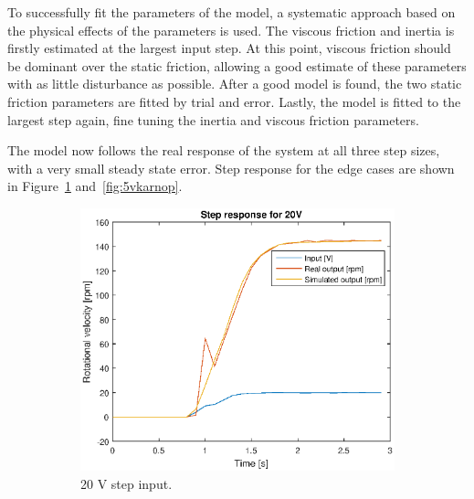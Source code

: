 To successfully fit the parameters of the model, a systematic approach based on
the physical effects of the parameters is used. The viscous friction and inertia 
is firstly estimated at the largest input step. At this point, viscous friction
should be dominant over the static friction, allowing a good estimate of these
parameters with as little disturbance as possible. After a good model is found,
the two static friction parameters are fitted by trial and error. Lastly, the
model is fitted to the largest step again, fine tuning the inertia and viscous
friction parameters.

The model now follows the real response of the system at all three step sizes,
with a very small steady state error. Step response for the edge cases are shown
in Figure~\ref{fig:20vkarnop} and~\ref{fig:5vkarnop}.
\begin{figure}[H]
    \centering
    \begin{subfigure}[H]{0.48\textwidth}
    \includegraphics[width=\textwidth]{./img/testrig_20Vstep_no_i_fric.eps}
    \caption{20 V step input.}\label{fig:20vkarnop}
    \end{subfigure}
    \begin{subfigure}[H]{0.48\textwidth}

\end{subfigure}
\end{figure}
